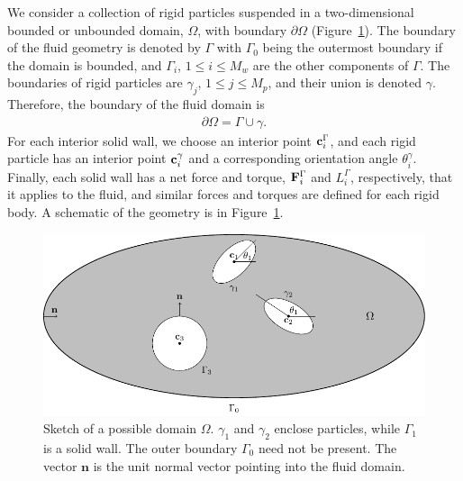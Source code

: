 \documentclass[preprint, 10pt]{elsarticle}
\begin{document}
We consider a collection of rigid particles suspended in a
two-dimensional bounded or unbounded domain, $\Omega$, with boundary
$\partial\Omega$ (Figure~\ref{fig:geomSchematic}).  The boundary of the
fluid geometry is denoted by $\Gamma$ with $\Gamma_0$ being the
outermost boundary if the domain is bounded, and $\Gamma_i$, $1\leq i
\leq M_w$ are the other components of $\Gamma$.  The boundaries of rigid
particles are $\gamma_j$, $1\leq j\leq M_p$, and their union is denoted
$\gamma$.  Therefore, the boundary of the fluid domain is
\begin{align*}
  \partial\Omega =\Gamma \cup \gamma.
\end{align*} 
For each interior solid wall, we choose an interior point
${\mathbf{c}}^\Gamma_i$, and each rigid particle has an interior point
${\mathbf{c}}^\gamma_i$ and a corresponding orientation angle $\theta^\gamma_i$.
Finally, each solid wall has a net force and torque, ${\mathbf{F}}^\Gamma_i$ and
$L^\Gamma_i$, respectively, that it applies to the fluid, and similar
forces and torques are defined for each rigid body.  A schematic of the
geometry is in Figure~\ref{fig:geomSchematic}.


%

\begin{figure}[!h]
\begin{center}
\includegraphics{figures/multiply_connected.pdf}
\end{center}
\caption{\label{fig:geomSchematic}Sketch of a possible domain $\Omega$.
  $\gamma_1$ and $\gamma_2$ enclose particles, while $\Gamma_1$ is a
  solid wall. The outer boundary $\Gamma_0$ need not be present.  The
  vector $\mathbf{n}$ is the unit normal vector pointing into the fluid
  domain.}
\end{figure}
\end{document}
